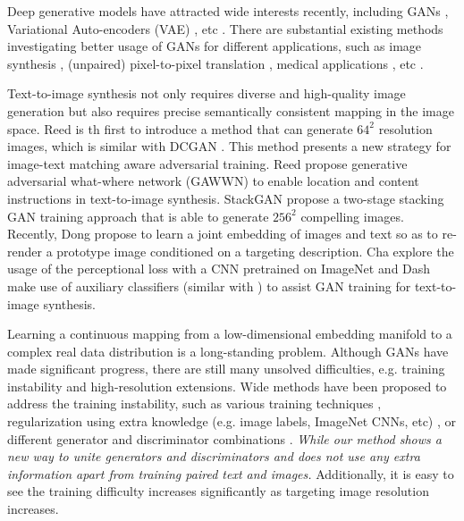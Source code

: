 \documentclass[10pt,twocolumn,letterpaper]{article}
\begin{document}
Deep generative models have attracted wide interests recently, including GANs \cite{goodfellow2014generative}, Variational Auto-encoders (VAE) \cite{kingma2013auto}, etc \cite{oord2016pixel}. 
There are substantial existing methods investigating better usage of GANs for different applications, such as image synthesis \cite{radford2015unsupervised, shrivastava2016learning}, (unpaired) pixel-to-pixel translation \cite{isola2016image,zhu2017unpaired}, medical applications \cite{costa2017towards}, etc \cite{ledig2016photo,huang2016stacked}.

Text-to-image synthesis not only requires diverse and high-quality image generation but also requires precise semantically consistent mapping in the image space.  Reed \etal \cite{reed2016generative}  is th first to introduce a method that can generate $64^2$ resolution images, which is similar with DCGAN \cite{radford2015unsupervised}. This method presents a new strategy for image-text matching aware adversarial training. Reed \etal \cite{reed2016learning} propose generative
adversarial what-where network (GAWWN) to enable location and content instructions in text-to-image synthesis. StackGAN \etal \cite{han2017stackgan} propose a two-stage stacking GAN training approach that is able to generate $256^2$ compelling images. Recently, Dong \etal \cite{dong2017semantic} propose to learn a joint embedding of images and text so as to re-render a prototype image conditioned on a targeting description. Cha \etal \cite{char2017perceptual} explore the usage of the perceptional loss with a CNN pretrained on ImageNet \cite{johnson2016perceptual} and Dash \etal \cite{dash2017tac} make use of auxiliary classifiers (similar with \cite{odena2016conditional}) to assist GAN training for text-to-image synthesis. 
	
Learning a continuous mapping from a low-dimensional embedding manifold to a complex real data distribution is a long-standing problem. Although GANs have made significant progress, there are still many unsolved difficulties, e.g. training instability and high-resolution extensions. Wide methods have been proposed to address the training instability, such as various training techniques \cite{salimans2016improved,arjovsky2017wasserstein,berthelot2017began,shrivastava2016learning,odena2016conditional}, regularization using extra knowledge (e.g. image labels, ImageNet CNNs, etc) \cite{dosovitskiy2016generating,ledig2016photo,dash2017tac,dash2017tac}, or different generator and discriminator combinations  \cite{metz2016unrolled,durugkar2016generative,yang2017lr,huang2016stacked}. \textit{While our method shows a new way to unite generators and discriminators and does not use any extra information apart from training paired text and images.} Additionally, it is easy to see the training difficulty increases significantly as targeting image resolution increases.
\end{document}
